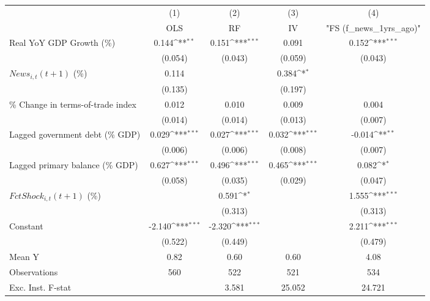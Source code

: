 {
\def\sym#1{\ifmmode^{#1}\else\(^{#1}\)\fi}
\begin{tabular}{l*{4}{c}}
\toprule
                    &\multicolumn{1}{c}{(1)}&\multicolumn{1}{c}{(2)}&\multicolumn{1}{c}{(3)}&\multicolumn{1}{c}{(4)}\\
                    &\multicolumn{1}{c}{OLS}&\multicolumn{1}{c}{RF}&\multicolumn{1}{c}{IV}&\multicolumn{1}{c}{ "FS (f_news_1yrs_ago)" }\\
\midrule
Real YoY GDP Growth (\%)&       0.144\sym{**} &       0.151\sym{***}&       0.091         &       0.152\sym{***}\\
                    &     (0.054)         &     (0.043)         &     (0.059)         &     (0.043)         \\
\addlinespace
$ News_{i,t}(t+1)$ (\%)&       0.114         &                     &       0.384\sym{*}  &                     \\
                    &     (0.135)         &                     &     (0.197)         &                     \\
\addlinespace
\% Change in terms-of-trade index&       0.012         &       0.010         &       0.009         &       0.004         \\
                    &     (0.014)         &     (0.014)         &     (0.013)         &     (0.007)         \\
\addlinespace
Lagged government debt (\% GDP)&       0.029\sym{***}&       0.027\sym{***}&       0.032\sym{***}&      -0.014\sym{**} \\
                    &     (0.006)         &     (0.006)         &     (0.008)         &     (0.007)         \\
\addlinespace
Lagged primary balance (\% GDP)&       0.627\sym{***}&       0.496\sym{***}&       0.465\sym{***}&       0.082\sym{*}  \\
                    &     (0.058)         &     (0.035)         &     (0.029)         &     (0.047)         \\
\addlinespace
$ FctShock_{i,t}(t+1)$ (\%)&                     &       0.591\sym{*}  &                     &       1.555\sym{***}\\
                    &                     &     (0.313)         &                     &     (0.313)         \\
\addlinespace
Constant            &      -2.140\sym{***}&      -2.320\sym{***}&                     &       2.211\sym{***}\\
                    &     (0.522)         &     (0.449)         &                     &     (0.479)         \\
\midrule
Mean Y              &        0.82         &        0.60         &        0.60         &        4.08         \\
Observations        &         560         &         522         &         521         &         534         \\
Exc. Inst. F-stat   &                     &       3.581         &      25.052         &      24.721         \\
\bottomrule
\end{tabular}
}
